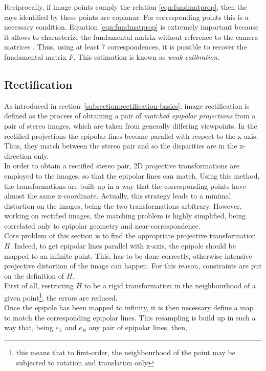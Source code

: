 Reciprocally, if image points comply the relation \ref{eqn:fundmatprop}, then the rays identified by these points are coplanar. 
For corresponding points this is a necessary condition.
Equation \ref{eqn:fundmatprop} is extremely important because it allows to characterize the fundamental matrix without reference to the camera matrices \cite{hartley2004multiple}.
Thus, using at least 7 correspondences, it is possible to recover the fundamental matrix $F$. 
This estimation is known as \textit{weak calibration}.\\

\subsection{Rectification}
\label{subsection:rectification}

As introduced in section~\ref{subsection:rectification-basics}, image rectification is defined as the process of obtaining a pair of \textit{matched epipolar projections} from a pair of stereo images, which are taken from generally differing viewpoints.
In the rectified projections the epipolar lines become parallel with respect to the x-axis. 
Thus, they match between the stereo pair and so the disparities are in the x-direction only.\\
In order to obtain a rectified stereo pair, 2D projective transformations are employed to the images, so that the epipolar lines can match.
Using this method, the transformations are built up in a way that the corresponding points have almost the same x-coordinate.
Actually, this strategy leads to a minimal distortion on the images, being the two transformations arbitrary. 
However, working on rectified images, the matching problem is highly simplified, being correlated only to epipolar geometry and near-correspondence. \\
Core problem of this section is to find the appropriate projective transformation $H$. 
Indeed, to get epipolar lines parallel with x-axis, the epipole should be mapped to an infinite point. 
This, has to be done correctly, otherwise intensive projective distortion of the image can happen.
For this reason, constraints are put on the definition of $H$.\\
First of all, restricting $H$ to be a rigid transformation in the neighbourhood of a given point\footnote{this means that to first-order, the neighbourhood of the point may be subjected to rotation and translation only}, the errors are reduced.\\
Once the epipole has been mapped to infinity, it is then necessary define a map to match the corresponding epipolar lines.
This resampling is build up in such a way that, being $e_L$ and $e_R$ any pair of epipolar lines, then,

